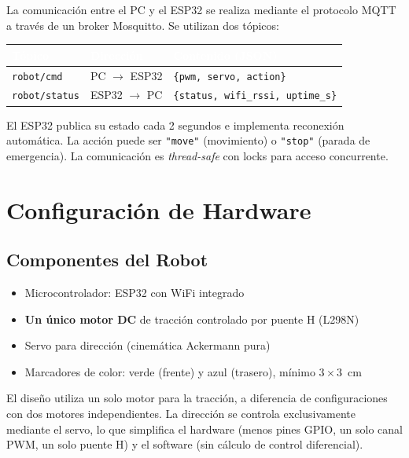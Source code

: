 \documentclass[11pt,a4paper]{article}
\begin{document}
La comunicación entre el PC y el ESP32 se realiza mediante el protocolo MQTT a través de un broker Mosquitto. Se utilizan dos tópicos:

\begin{table}[h!]
\centering
{}
\begin{tabularx}{\textwidth}{l l X}
    \toprule
    \rowcolor{azultabla}\textcolor{white}{\textbf{Tópico}} & \textcolor{white}{\textbf{Dirección}} & \textcolor{white}{\textbf{Contenido (JSON)}} \\
    \midrule
    \texttt{robot/cmd}    & PC $\rightarrow$ ESP32 & \texttt{\{pwm, servo, action\}} \\
    \texttt{robot/status} & ESP32 $\rightarrow$ PC & \texttt{\{status, wifi\_rssi, uptime\_s\}} \\
    \bottomrule
\end{tabularx}
\end{table}

El ESP32 publica su estado cada 2 segundos e implementa reconexión automática. La acción puede ser \texttt{"move"} (movimiento) o \texttt{"stop"} (parada de emergencia). La comunicación es \textit{thread-safe} con locks para acceso concurrente.

\section{Configuración de Hardware}

\subsection{Componentes del Robot}

\begin{itemize}[nosep]
    \item Microcontrolador: ESP32 con WiFi integrado
    \item \textbf{Un único motor DC} de tracción controlado por puente H (L298N)
    \item Servo para dirección (cinemática Ackermann pura)
    \item Marcadores de color: verde (frente) y azul (trasero), mínimo $3 \times 3$~cm
\end{itemize}

El diseño utiliza un solo motor para la tracción, a diferencia de configuraciones con dos motores independientes. La dirección se controla exclusivamente mediante el servo, lo que simplifica el hardware (menos pines GPIO, un solo canal PWM, un solo puente H) y el software (sin cálculo de control diferencial).
\end{document}
